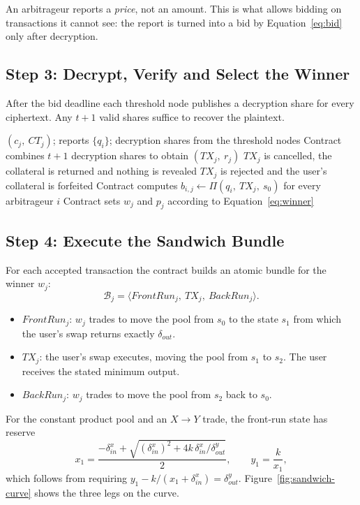An arbitrageur reports a \emph{price}, not an amount. This is what allows bidding on transactions it cannot see: the report is turned into a bid by Equation~\ref{eq:bid} only after decryption.

\subsection{Step 3: Decrypt, Verify and Select the Winner}

After the bid deadline each threshold node publishes a decryption share for every ciphertext. Any $t+1$ valid shares suffice to recover the plaintext.

\begin{algorithm}[h]
\caption{Decryption and Winner Selection (Step 3)}
\begin{algorithmic}[1]
\Require $(c_j,\ CT_j)$; reports $\{q_i\}$; decryption shares from the threshold nodes
\State Contract combines $t+1$ decryption shares to obtain $(TX_j,\ r_j)$
    \State $TX_j$ is cancelled, the collateral is returned and nothing is revealed
    \State $TX_j$ is rejected and the user's collateral is forfeited
\Else
    \State Contract computes $b_{i,j}\leftarrow\Pi(q_i,\ TX_j,\ s_0)$ for every arbitrageur $i$
    \State Contract sets $w_j$ and $p_j$ according to Equation~\ref{eq:winner}
\EndIf
\end{algorithmic}
\end{algorithm}

\subsection{Step 4: Execute the Sandwich Bundle}

For each accepted transaction the contract builds an atomic bundle for the winner $w_j$:
\begin{equation}
\mathcal{B}_j=\langle \mathit{FrontRun}_j,\ TX_j,\ \mathit{BackRun}_j\rangle .
\label{eq:bundle}
\end{equation}
\begin{itemize}
    \item $\mathit{FrontRun}_j$: $w_j$ trades to move the pool from $s_0$ to the state $s_1$ from which the user's swap returns exactly $\delta_{out}$.
    \item $TX_j$: the user's swap executes, moving the pool from $s_1$ to $s_2$. The user receives the stated minimum output.
    \item $\mathit{BackRun}_j$: $w_j$ trades to move the pool from $s_2$ back to $s_0$.
\end{itemize}
For the constant product pool and an $X\rightarrow Y$ trade, the front-run state has reserve
\begin{equation}
x_1=\frac{-\delta^{x}_{in}+\sqrt{(\delta^{x}_{in})^{2}+4k\,\delta^{x}_{in}/\delta^{y}_{out}}}{2},
\qquad y_1=\frac{k}{x_1},
\label{eq:frontstate}
\end{equation}
which follows from requiring $y_1-k/(x_1+\delta^{x}_{in})=\delta^{y}_{out}$. Figure~\ref{fig:sandwich-curve} shows the three legs on the curve.

